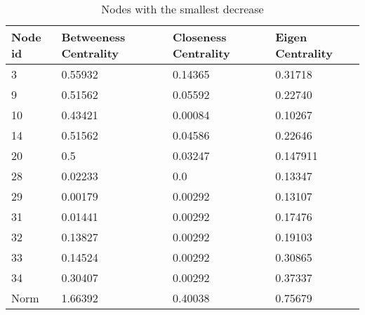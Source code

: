 \begin{table}[t]
 \centering
 \caption{Nodes with the smallest decrease}
 \label{tab:nodesSmallest}
 \begin{tabular}{| l || l | l | l |}
 \hline
  Node id & Betweeness Centrality& Closeness Centrality & Eigen Centrality\\
  \hline
  \hline
  3 & 0.55932 & 0.14365 & 0.31718\\
  \hline
  9 & 0.51562 & 0.05592 & 0.22740\\
  \hline
  10 & 0.43421 & 0.00084 &  0.10267\\
  \hline
  14 & 0.51562 & 0.04586 & 0.22646\\
  \hline
  20 & 0.5 & 0.03247 & 0.147911\\
  \hline
  28 &  0.02233 & 0.0 & 0.13347\\ 
  \hline
  29 & 0.00179 & 0.00292 & 0.13107\\
   \hline
  31 & 0.01441 & 0.00292 & 0.17476\\ 
   \hline
  32 & 0.13827 & 0.00292 & 0.19103\\ 
   \hline
  33 & 0.14524 & 0.00292 & 0.30865\\ 
   \hline
  34 & 0.30407 & 0.00292 & 0.37337\\  
  \hline
  \hline
    Norm & 1.66392 & 0.40038 & 0.75679\\ 
  \hline
 \end{tabular}
\end{table}



